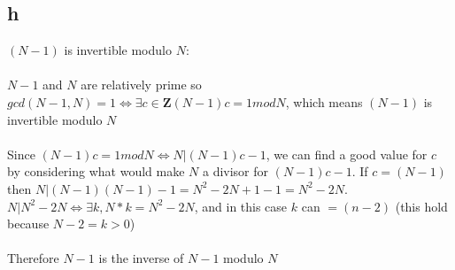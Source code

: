 \documentclass[]{article}
\begin{document}
\subsection{h}

$(N - 1)$ is invertible modulo $N$:
\\\\
$N - 1$ and $N$ are relatively prime so $gcd(N-1, N) = 1 \Leftrightarrow \exists c \in \textbf{Z} (N - 1)c = 1 mod N$, which means $(N - 1)$ is invertible modulo $N$
\\\\
Since $(N - 1)c = 1 mod N \Leftrightarrow N | (N - 1)c - 1$, we can find a good value for $c$ by considering what would make $N$ a divisor for $(N-1)c - 1$. If $c = (N - 1)$ then $N | (N - 1)(N - 1) - 1 = N^2 - 2N  + 1 - 1 = N^2 -2N$. $N | N^2 - 2N \Leftrightarrow \exists k, N * k = N^2 - 2N$, and in this case $k$ can $= (n - 2)$ (this hold because $N - 2 = k > 0$)
\\\\
Therefore $N - 1$ is the inverse of $N - 1$ modulo $N$
\end{document}
